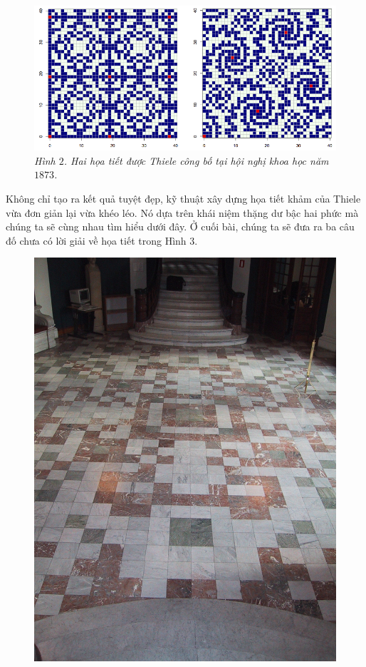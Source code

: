 \begin{multicols}{2}
	\begin{figure}[H]
		\vspace*{-5pt}
		\centering
		\captionsetup{labelformat= empty, justification=centering}
		\includegraphics[width= 1\linewidth]{mosaique-2.png}
		\caption{\small\textit{\color{toanhocdoisong}Hình $2$. Hai họa tiết được Thiele công bố tại hội nghị khoa học năm $1873$.}}
		\vspace*{-5pt}
	\end{figure}
	Không chỉ tạo ra kết quả tuyệt đẹp, kỹ thuật xây dựng họa tiết khảm của Thiele vừa đơn giản lại vừa khéo léo. Nó dựa trên khái niệm thặng dư bậc hai phức mà chúng ta sẽ cùng nhau tìm hiểu dưới đây. Ở cuối bài, chúng ta sẽ đưa ra ba câu đố chưa có lời giải về họa tiết trong Hình $3$.
	\begin{figure}[H]
		\vspace*{-5pt}
		\centering
		\captionsetup{labelformat= empty, justification=centering}
		\includegraphics[width= 0.65\linewidth]{mosaique-3}

\end{figure}
\end{multicols}
